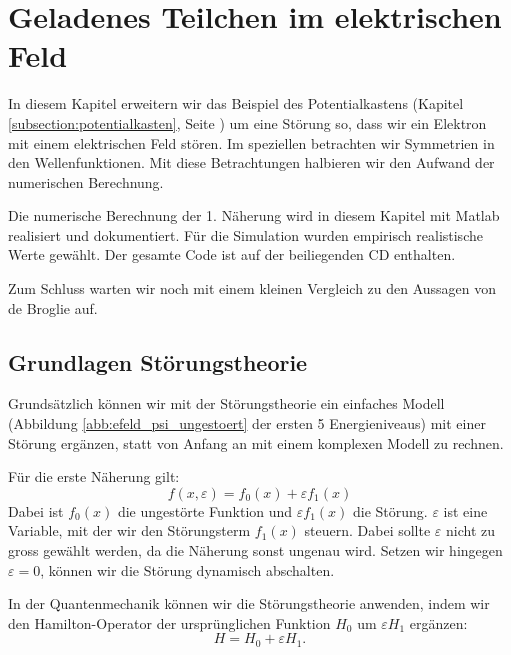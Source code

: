 \chapter{Geladenes Teilchen im elektrischen Feld\label{chapter:efeld}}
\begin{refsection}



In diesem Kapitel erweitern wir das Beispiel des Potentialkastens 
(Kapitel \ref{subsection:potentialkasten}, Seite \pageref{subsection:potentialkasten})
um eine St\"orung so, dass wir ein Elektron mit einem elektrischen Feld st\"oren.
Im speziellen betrachten wir Symmetrien in den Wellenfunktionen.
Mit diese Betrachtungen halbieren wir den Aufwand der numerischen Berechnung.

Die numerische Berechnung der 1. N\"aherung wird in diesem Kapitel mit Matlab realisiert und dokumentiert. 
F\"ur die Simulation wurden empirisch realistische Werte gew\"ahlt.
Der gesamte Code ist auf der beiliegenden CD enthalten.

Zum Schluss warten wir noch mit einem kleinen Vergleich zu den Aussagen von de Broglie \cite{efeld:de_Broglie} auf.



\section{Grundlagen St\"orungstheorie}
Grunds\"atzlich k\"onnen wir mit der St\"orungstheorie ein einfaches Modell 
(Abbildung \ref{abb:efeld_psi_ungestoert} der ersten 5 Energieniveaus) 
mit einer St\"orung erg\"anzen, statt von Anfang an mit einem komplexen Modell zu rechnen.

F\"ur die erste N\"aherung gilt:
\[
  f(x, \varepsilon) = f_0(x) + \varepsilon f_1(x)
\]
Dabei ist $f_0(x)$ die ungest\"orte Funktion und $\varepsilon f_1(x)$ die St\"orung.
$\varepsilon$ ist eine Variable, mit der wir den St\"orungsterm $f_1(x)$ steuern.
Dabei sollte $\varepsilon$ nicht zu gross gew\"ahlt werden,
da die N\"aherung sonst ungenau wird.
Setzen wir hingegen $\varepsilon = 0$, k\"onnen wir die St\"orung dynamisch abschalten.




In der Quantenmechanik k\"onnen wir die St\"orungstheorie anwenden,
indem wir den Hamilton-Operator der urspr\"unglichen Funktion $H_0$
um $\varepsilon H_1$ erg\"anzen:
\[
  H = H_0 + \varepsilon H_1.
\]


\end{refsection}
